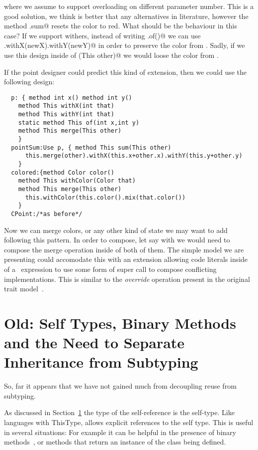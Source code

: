 where we assume to support overloading on different parameter number.
This is a good solution, we think is better that any alternatives in literature,
however the method \Q@CPoint.sum@ resets the color to red.
What should be the behaviour in this case?
If we support withers, instead of writing \Q@This.of()@ we can use
\Q@this.withX(newX).withY(newY)@ in order to preserve the color from \Q@this@.
Sadly, if we use this design inside of \Q@sum(This other)@ we would loose the color from \Q@other@.

If the point designer could predict this kind of extension, then we could use the following design:  
\begin{lstlisting}
  p: { method int x() method int y()
    method This withX(int that)
    method This withY(int that)
    static method This of(int x,int y)
    method This merge(This other)
    }
  pointSum:Use p, { method This sum(This other)
      this.merge(other).withX(this.x+other.x).withY(this.y+other.y)
    }
  colored:{method Color color()
    method This withColor(Color that)
    method This merge(This other)
      this.withColor(this.color().mix(that.color())
    }
  CPoint:/*as before*/
\end{lstlisting}  
  Now we can merge colors, or any other kind of state we may want to add
  following this pattern.
  In order to compose, let say \Q@colored@ with \Q@flavored@ we would
  need to compose the merge operation inside of both of them.
  The simple model we are presenting could accomodate this with an
  extension allowing code literals inside of a \use\ expression to use some form of super call to compose conflicting implementations. This is similar to the \emph{override} operation present in the original trait model~\cite{ducasse2006traits}.
  



\section{Old: Self Types, Binary Methods and the Need to Separate
  Inheritance from Subtyping}

So, far it appears that we have not gained much from decoupling
reuse from subtyping.

As discussed in Section~\ref{} the type of the self-reference is the
self-type. Like languages with ThisType, \name allows explicit
references to the self type. This is useful in several situations: 
For example it can be helpful in the presence of binary
methods~\cite{}, or methods that return an instance of the 
class being defined. 



